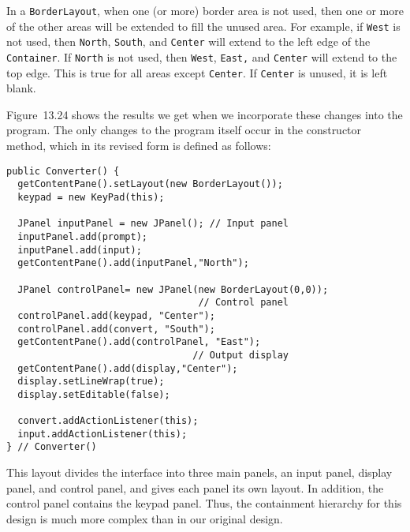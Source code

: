 \begin{figure}[h!]
\end{figure}

In a {\tt BorderLayout}, when one (or more) border area is not used,
then one or more of the other areas will be extended to fill the
unused area.  For example, if {\tt West} is not used, then {\tt North},
{\tt South}, and {\tt Center} will extend to the left edge of the
{\tt Container}. If {\tt North} is not used, then {\tt West}, {\tt East,} and
{\tt Center} will extend to the top edge.  This is true for all areas except
{\tt Center}. If {\tt Center} is unused, it is left blank.

\pagebreak
Figure~13.24 shows the results we get when we incorporate these
changes into the program.  The only changes to the program itself
occur in the constructor method, which in its revised form is defined
as follows:

\begin{jjjlisting}
\begin{lstlisting}
public Converter() {
  getContentPane().setLayout(new BorderLayout());
  keypad = new KeyPad(this);

  JPanel inputPanel = new JPanel(); // Input panel
  inputPanel.add(prompt);
  inputPanel.add(input);
  getContentPane().add(inputPanel,"North");

  JPanel controlPanel= new JPanel(new BorderLayout(0,0)); 
                                  // Control panel
  controlPanel.add(keypad, "Center");
  controlPanel.add(convert, "South");
  getContentPane().add(controlPanel, "East");
                                 // Output display
  getContentPane().add(display,"Center");  
  display.setLineWrap(true);
  display.setEditable(false);

  convert.addActionListener(this);
  input.addActionListener(this);
} // Converter()
\end{lstlisting}
\end{jjjlisting}

\noindent This layout divides the interface into three main panels,
an input panel, display panel, and control panel, and gives each panel
its own layout.  In addition, the control panel contains the keypad
panel.  Thus, the containment hierarchy for this design is
much more complex than in our original design.

